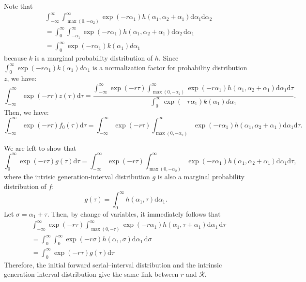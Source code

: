 \documentclass[12pt]{article}
\begin{document}
Note that 
\begin{equation}
\begin{aligned}
&\int_{-\infty}^\infty \int_{\max{(0,-\alpha_2)}}^{\infty} \exp(-r\alpha_1) h(\alpha_1, \alpha_2 + \alpha_1) \mathrm{d}\alpha_1 \mathrm{d}\alpha_2\\
&= \int_{0}^\infty \int_{-\alpha_1}^\infty \exp(- r \alpha_1) h(\alpha_1, \alpha_2+\alpha_1) \mathrm{d}\alpha_2\,\mathrm{d} \alpha_1\\
&= \int_{0}^\infty \exp(- r \alpha_1) k(\alpha_1) d\alpha_1
\end{aligned}
\end{equation}
because $k$ is a marginal probability distribution of $h$.
Since $\int_{0}^\infty \exp(- r \alpha_1) k(\alpha_1) d\alpha_1$ is a normalization factor for probability distribution $z$, we have:
\begin{equation}
\int_{-\infty}^\infty \exp(-r\tau) z(\tau) \mathrm{d} \tau = \frac{\int_{-\infty}^\infty \exp(-r\tau) \int_{\max{(0,-\alpha_2)}}^{\infty} \exp(-r\alpha_1) h(\alpha_1, \alpha_2 + \alpha_1) \mathrm{d}\alpha_1 \mathrm{d}\tau}{\int_{0}^\infty \exp(- r \alpha_1) k(\alpha_1) d\alpha_1}.
\end{equation}
Then, we have:
\begin{equation}
\int_{-\infty}^\infty \exp(-r\tau) f_{0}(\tau) \mathrm{d} \tau = \int_{-\infty}^\infty \exp(-r\tau) \int_{\max{(0,-\alpha_2)}}^{\infty} \exp(-r\alpha_1) h(\alpha_1, \alpha_2 + \alpha_1) \mathrm{d}\alpha_1 \mathrm{d}\tau.
\end{equation}

We are left to show that 
\begin{equation}
\int_0^{\infty} \exp(-r\tau) g(\tau) \mathrm{d}\tau = \int_{-\infty}^\infty \exp(-r\tau) \int_{\max{(0,-\alpha_2)}}^{\infty} \exp(-r\alpha_1) h(\alpha_1, \alpha_2 + \alpha_1) \mathrm{d}\alpha_1 \mathrm{d}\tau,
\end{equation}
where the intrisic generation-interval distribution $g$ is also a marginal probability distribution of $f$:
\begin{equation}
g(\tau) = \int_0^\infty h(\alpha_1, \tau)  \mathrm{d} \alpha_1.
\end{equation}
Let $\sigma = \alpha_1 + \tau$. Then, by change of variables, it immediately follows that
\begin{equation}
\begin{aligned}
&\int_{-\infty}^{\infty} \exp(-r\tau) \int_{\max(0, -\tau)}^\infty \exp(- r \alpha_1) h(\alpha_1, \tau+\alpha_1) \mathrm{d} \alpha_1\, \mathrm{d}\tau\\
&=\int_{0}^{\infty} \int_{0}^\infty \exp(- r \sigma) h(\alpha_1, \sigma) \mathrm{d} \alpha_1\, \mathrm{d}\sigma\\
&=\int_{0}^{\infty} \exp(-r\tau) g(\tau) \mathrm{d}\tau
\end{aligned}
\end{equation}
Therefore, the initial forward serial--interval distribution and the intrinsic generation-interval distribution give the same link between $r$ and $\mathcal R$.


\end{document}
